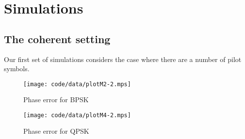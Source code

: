 \documentclass[a4paper,10pt]{article}
\begin{document}
\section{Simulations}\label{sec:simulations}

\subsection{The coherent setting}

Our first set of simulations considers the case where there are a number of pilot symbols.



\begin{figure*}[tp]
	\centering
		\texttt{[image: code/data/plotM2-2.mps]}
		\caption{Phase error for BPSK}
		\label{fig:plotphase}
\end{figure*}




\begin{figure*}[tp]
	\centering
		\texttt{[image: code/data/plotM4-2.mps]}
		\caption{Phase error for QPSK}
		\label{fig:plotphase}
\end{figure*}


\end{document}
